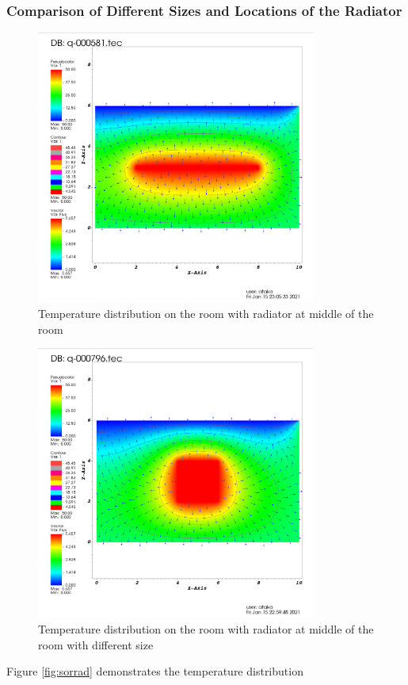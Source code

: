 \documentclass[letterpaper,12pt]{article}
\begin{document}
\subsubsection{Comparison of Different Sizes and Locations of the Radiator}
\begin{figure}[H] 
	\centering 
	\includegraphics[max height=9cm]{graphs/radiator_middle_long/radiator_middle_long.png}
	\caption{Temperature distribution on the room with radiator at middle of the room}
 	\label{fig:middlelong}
\end{figure}
\begin{figure}[H] 
	\centering 
	\includegraphics[max height=9cm]{graphs/radiator_middle/radiator_middle.png}
	\caption{Temperature distribution on the room with radiator at middle of the room with different size}
 	\label{fig:middle}
\end{figure}
Figure \ref{fig:sorrad} demonstrates the temperature distribution
\end{document}
